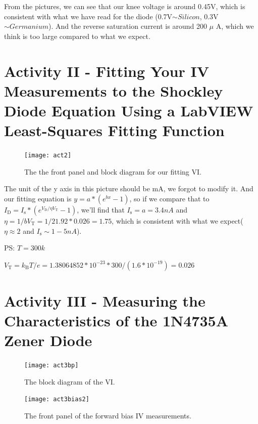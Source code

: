 \documentclass[11pt]{article}
\begin{document}
From the pictures, we can see that our knee voltage is around 0.45V, which is consistent with what we have read for the diode (0.7V$\sim{Silicon}$, 0.3V$\sim{Germanium}$). And the reverse saturation current is around 200 $\mu$ A, which we think is too large compared to what we expect.



\section{Activity II - Fitting Your IV Measurements to the Shockley Diode Equation Using a LabVIEW Least-Squares Fitting Function}


\begin{figure}[H]
 \begin{center}
  \texttt{[image: act2]}
  \caption{The the front panel and block diagram for our fitting VI.}
  \label{fig:act2}
 \end{center}
\end{figure}

The unit of the y axis in this picture should be mA, we forgot to modify it. And our fitting equation is $y=a*(e^{bx}-1)$, so if we compare that to $I_{\mathrm {D} }=I_{\mathrm {s} }*(e^{V_{\mathrm {D} }/ \eta V_{\mathrm {T} }}-1)$, we'll find that $I_{\mathrm {s} }=a=3.4 nA$ and $\eta=1/{bV_{\mathrm {T} }}=1/{21.92*0.026}=1.75$, which is consistent with what we expect($ \eta \approx 2$ and $I_{\mathrm {s} }\sim 1-5 nA$).

PS: $T=300k$

$V_{\mathrm {T} }=k_{\mathrm {B} }T/e=1.38064852*10^{-23}*300/(1.6*10^{-19})=0.026$



\section{Activity III - Measuring the Characteristics of the 1N4735A Zener Diode}



\begin{figure}[H]
 \begin{center}
  \texttt{[image: act3bp]}
  \caption{The block diagram of the VI.}
  \label{fig:act3bp}
 \end{center}
\end{figure}

\begin{figure}[H]
 \begin{center}
  \texttt{[image: act3bias2]}
  \caption{The front panel of the forward bias IV measurements.}
  \label{fig:act3bias2}
 \end{center}
\end{figure}
\end{document}
